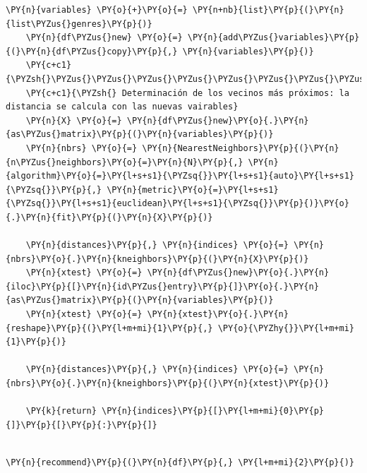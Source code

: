 \begin{tcolorbox}[breakable, size=fbox, boxrule=1pt, pad at break*=1mm,colback=cellbackground, colframe=cellborder]
\begin{Verbatim}[commandchars=\\\{\}]
    \PY{n}{variables} \PY{o}{+}\PY{o}{=} \PY{n+nb}{list}\PY{p}{(}\PY{n}{list\PYZus{}genres}\PY{p}{)}
    \PY{n}{df\PYZus{}new} \PY{o}{=} \PY{n}{add\PYZus{}variables}\PY{p}{(}\PY{n}{df\PYZus{}copy}\PY{p}{,} \PY{n}{variables}\PY{p}{)}
    \PY{c+c1}{\PYZsh{}\PYZus{}\PYZus{}\PYZus{}\PYZus{}\PYZus{}\PYZus{}\PYZus{}\PYZus{}\PYZus{}\PYZus{}\PYZus{}\PYZus{}\PYZus{}\PYZus{}\PYZus{}\PYZus{}\PYZus{}\PYZus{}\PYZus{}\PYZus{}\PYZus{}\PYZus{}\PYZus{}\PYZus{}\PYZus{}\PYZus{}\PYZus{}\PYZus{}\PYZus{}\PYZus{}\PYZus{}\PYZus{}\PYZus{}\PYZus{}\PYZus{}\PYZus{}\PYZus{}\PYZus{}\PYZus{}\PYZus{}\PYZus{}\PYZus{}\PYZus{}\PYZus{}\PYZus{}\PYZus{}\PYZus{}\PYZus{}\PYZus{}\PYZus{}\PYZus{}\PYZus{}\PYZus{}\PYZus{}\PYZus{}\PYZus{}\PYZus{}\PYZus{}\PYZus{}\PYZus{}\PYZus{}\PYZus{}\PYZus{}\PYZus{}\PYZus{}\PYZus{}\PYZus{}\PYZus{}\PYZus{}\PYZus{}\PYZus{}\PYZus{}\PYZus{}\PYZus{}\PYZus{}\PYZus{}\PYZus{}\PYZus{}\PYZus{}\PYZus{}\PYZus{}\PYZus{}\PYZus{}\PYZus{}}
    \PY{c+c1}{\PYZsh{} Determinación de los vecinos más próximos: la distancia se calcula con las nuevas vairables}
    \PY{n}{X} \PY{o}{=} \PY{n}{df\PYZus{}new}\PY{o}{.}\PY{n}{as\PYZus{}matrix}\PY{p}{(}\PY{n}{variables}\PY{p}{)}
    \PY{n}{nbrs} \PY{o}{=} \PY{n}{NearestNeighbors}\PY{p}{(}\PY{n}{n\PYZus{}neighbors}\PY{o}{=}\PY{n}{N}\PY{p}{,} \PY{n}{algorithm}\PY{o}{=}\PY{l+s+s1}{\PYZsq{}}\PY{l+s+s1}{auto}\PY{l+s+s1}{\PYZsq{}}\PY{p}{,} \PY{n}{metric}\PY{o}{=}\PY{l+s+s1}{\PYZsq{}}\PY{l+s+s1}{euclidean}\PY{l+s+s1}{\PYZsq{}}\PY{p}{)}\PY{o}{.}\PY{n}{fit}\PY{p}{(}\PY{n}{X}\PY{p}{)}

    \PY{n}{distances}\PY{p}{,} \PY{n}{indices} \PY{o}{=} \PY{n}{nbrs}\PY{o}{.}\PY{n}{kneighbors}\PY{p}{(}\PY{n}{X}\PY{p}{)}    
    \PY{n}{xtest} \PY{o}{=} \PY{n}{df\PYZus{}new}\PY{o}{.}\PY{n}{iloc}\PY{p}{[}\PY{n}{id\PYZus{}entry}\PY{p}{]}\PY{o}{.}\PY{n}{as\PYZus{}matrix}\PY{p}{(}\PY{n}{variables}\PY{p}{)}
    \PY{n}{xtest} \PY{o}{=} \PY{n}{xtest}\PY{o}{.}\PY{n}{reshape}\PY{p}{(}\PY{l+m+mi}{1}\PY{p}{,} \PY{o}{\PYZhy{}}\PY{l+m+mi}{1}\PY{p}{)}

    \PY{n}{distances}\PY{p}{,} \PY{n}{indices} \PY{o}{=} \PY{n}{nbrs}\PY{o}{.}\PY{n}{kneighbors}\PY{p}{(}\PY{n}{xtest}\PY{p}{)}

    \PY{k}{return} \PY{n}{indices}\PY{p}{[}\PY{l+m+mi}{0}\PY{p}{]}\PY{p}{[}\PY{p}{:}\PY{p}{]}
    
\end{Verbatim}
\end{tcolorbox}

    \begin{tcolorbox}[breakable, size=fbox, boxrule=1pt, pad at break*=1mm,colback=cellbackground, colframe=cellborder]
\begin{Verbatim}[commandchars=\\\{\}]
\PY{n}{recommend}\PY{p}{(}\PY{n}{df}\PY{p}{,} \PY{l+m+mi}{2}\PY{p}{)}
\end{Verbatim}
\end{tcolorbox}

